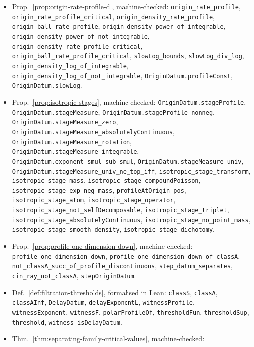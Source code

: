 {\begin{itemize}
\item Prop.~\ref{prop:origin-rate-profile-d}, machine-checked:
  \texttt{origin\_rate\_profile}, \texttt{origin\_rate\_profile\_critical}, \texttt{origin\_density\_rate\_profile}, \texttt{origin\_ball\_rate\_profile}, \texttt{origin\_density\_power\_of\_integrable}, \texttt{origin\_density\_power\_of\_not\_integrable}, \texttt{origin\_density\_rate\_profile\_critical}, \texttt{origin\_ball\_rate\_profile\_critical}, \texttt{slowLog\_bounds}, \texttt{slowLog\_div\_log}, \texttt{origin\_density\_log\_of\_integrable}, \texttt{origin\_density\_log\_of\_not\_integrable}, \texttt{OriginDatum.profileConst}, \texttt{OriginDatum.slowLog}.
\item Prop.~\ref{prop:isotropic-stages}, machine-checked:
  \texttt{OriginDatum.stageProfile}, \texttt{OriginDatum.stageMeasure}, \texttt{OriginDatum.stageProfile\_nonneg}, \texttt{OriginDatum.stageMeasure\_zero}, \texttt{OriginDatum.stageMeasure\_absolutelyContinuous}, \texttt{OriginDatum.stageMeasure\_rotation}, \texttt{OriginDatum.stageMeasure\_integrable}, \texttt{OriginDatum.exponent\_smul\_sub\_smul}, \texttt{OriginDatum.stageMeasure\_univ}, \texttt{OriginDatum.stageMeasure\_univ\_ne\_top\_iff}, \texttt{isotropic\_stage\_transform}, \texttt{isotropic\_stage\_mass}, \texttt{isotropic\_stage\_compoundPoisson}, \texttt{isotropic\_stage\_exp\_neg\_mass}, \texttt{profileAtOrigin\_pos}, \texttt{isotropic\_stage\_atom}, \texttt{isotropic\_stage\_operator}, \texttt{isotropic\_stage\_not\_selfDecomposable}, \texttt{isotropic\_stage\_triplet}, \texttt{isotropic\_stage\_absolutelyContinuous}, \texttt{isotropic\_stage\_no\_point\_mass}, \texttt{isotropic\_stage\_smooth\_density}, \texttt{isotropic\_stage\_dichotomy}.
\item Prop.~\ref{prop:profile-one-dimension-down}, machine-checked:
  \texttt{profile\_one\_dimension\_down}, \texttt{profile\_one\_dimension\_down\_of\_classA}, \texttt{not\_classA\_succ\_of\_profile\_discontinuous}, \texttt{step\_datum\_separates}, \texttt{cin\_ray\_not\_classA}, \texttt{stepOriginDatum}.
\item Def.~\ref{def:filtration-thresholds}, formalised in Lean:
  \texttt{classS}, \texttt{classA}, \texttt{classAInf}, \texttt{DelayDatum}, \texttt{delayExponentL}, \texttt{witnessProfile}, \texttt{witnessExponent}, \texttt{witnessF}, \texttt{polarProfileOf}, \texttt{thresholdFun}, \texttt{thresholdSup}, \texttt{threshold}, \texttt{witness\_isDelayDatum}.
\item Thm.~\ref{thm:separating-family-critical-values}, machine-checked:

\end{itemize}}

